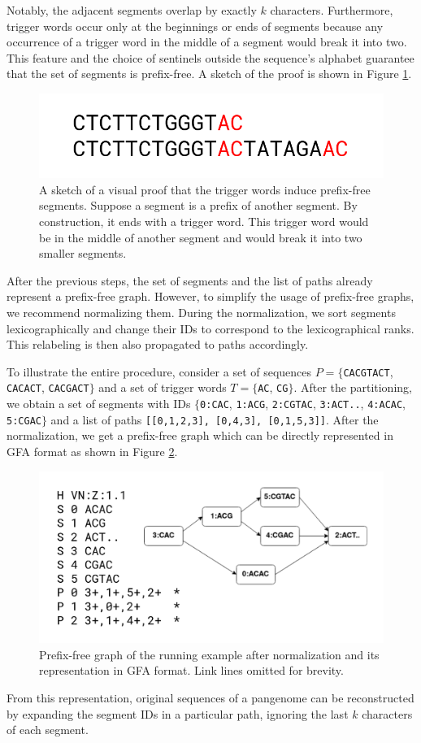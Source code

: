 Notably, the adjacent segments overlap by exactly $k$ characters.
Furthermore, trigger words occur only at the beginnings or ends of segments because any occurrence of a trigger word in the middle of a segment would break it into two.
This feature and the choice of sentinels outside the sequence's alphabet guarantee that the set of segments is prefix-free.
A sketch of the proof is shown in Figure \ref{fig:proof}.

\begin{figure}
    \centering
    \includegraphics[width=0.6\linewidth]{images/prefixfree_proof.png}
    \caption{
        A sketch of a visual proof that the trigger words induce prefix-free segments.
        Suppose a segment is a prefix of another segment.
        By construction, it ends with a trigger word.
        This trigger word would be in the middle of another segment and would break it into two smaller segments.
    }
    \label{fig:proof}
\end{figure}

After the previous steps, the set of segments and the list of paths already represent a prefix-free graph.
However, to simplify the usage of prefix-free graphs, we recommend normalizing them.
During the normalization, we sort segments lexicographically and change their IDs to correspond to the lexicographical ranks.
This relabeling is then also propagated to paths accordingly. 

To illustrate the entire procedure, consider a set of sequences $P = \{$\texttt{CACGTACT}, \texttt{CACACT}, \texttt{CACGACT}$\}$ and a set of trigger words $T = \{$\texttt{AC}, \texttt{CG}$\}$.
After the partitioning, we obtain a set of segments with IDs $\{$\texttt{0:CAC}, \texttt{1:ACG}, \texttt{2:CGTAC}, \texttt{3:ACT..}, \texttt{4:ACAC}, \texttt{5:CGAC}$\}$ and a list of paths \texttt{[[0,1,2,3], [0,4,3], [0,1,5,3]]}.
After the normalization, we get a prefix-free graph which can be directly represented in GFA format as shown in Figure \ref{fig:gfa}.

\begin{figure}
    \centering
    \includegraphics[width=\linewidth]{images/pfg_gfa.v3.png}
    \caption{
        Prefix-free graph of the running example after normalization and its representation in GFA format.
        Link lines omitted for brevity.
    }
    \label{fig:gfa}
\end{figure}

From this representation, original sequences of a pangenome can be reconstructed by expanding the segment IDs in a particular path, ignoring the last $k$ characters of each segment.


